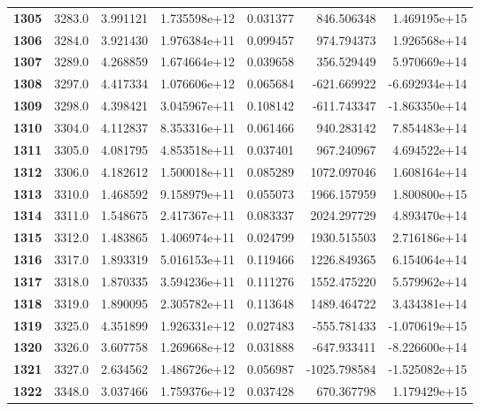\documentclass{report}[12pt]
\begin{document}
\begin{center}
\begin{tabular}{lrrrrrr}
\textbf{1305} &         3283.0 &   3.991121 &  1.735598e+12 &    0.031377 &   846.506348 &  1.469195e+15 \\
\textbf{1306} &         3284.0 &   3.921430 &  1.976384e+11 &    0.099457 &   974.794373 &  1.926568e+14 \\
\textbf{1307} &         3289.0 &   4.268859 &  1.674664e+12 &    0.039658 &   356.529449 &  5.970669e+14 \\
\textbf{1308} &         3297.0 &   4.417334 &  1.076606e+12 &    0.065684 &  -621.669922 & -6.692934e+14 \\
\textbf{1309} &         3298.0 &   4.398421 &  3.045967e+11 &    0.108142 &  -611.743347 & -1.863350e+14 \\
\textbf{1310} &         3304.0 &   4.112837 &  8.353316e+11 &    0.061466 &   940.283142 &  7.854483e+14 \\
\textbf{1311} &         3305.0 &   4.081795 &  4.853518e+11 &    0.037401 &   967.240967 &  4.694522e+14 \\
\textbf{1312} &         3306.0 &   4.182612 &  1.500018e+11 &    0.085289 &  1072.097046 &  1.608164e+14 \\
\textbf{1313} &         3310.0 &   1.468592 &  9.158979e+11 &    0.055073 &  1966.157959 &  1.800800e+15 \\
\textbf{1314} &         3311.0 &   1.548675 &  2.417367e+11 &    0.083337 &  2024.297729 &  4.893470e+14 \\
\textbf{1315} &         3312.0 &   1.483865 &  1.406974e+11 &    0.024799 &  1930.515503 &  2.716186e+14 \\
\textbf{1316} &         3317.0 &   1.893319 &  5.016153e+11 &    0.119466 &  1226.849365 &  6.154064e+14 \\
\textbf{1317} &         3318.0 &   1.870335 &  3.594236e+11 &    0.111276 &  1552.475220 &  5.579962e+14 \\
\textbf{1318} &         3319.0 &   1.890095 &  2.305782e+11 &    0.113648 &  1489.464722 &  3.434381e+14 \\
\textbf{1319} &         3325.0 &   4.351899 &  1.926331e+12 &    0.027483 &  -555.781433 & -1.070619e+15 \\
\textbf{1320} &         3326.0 &   3.607758 &  1.269668e+12 &    0.031888 &  -647.933411 & -8.226600e+14 \\
\textbf{1321} &         3327.0 &   2.634562 &  1.486726e+12 &    0.056987 & -1025.798584 & -1.525082e+15 \\
\textbf{1322} &         3348.0 &   3.037466 &  1.759376e+12 &    0.037428 &   670.367798 &  1.179429e+15 \\

\end{tabular}
\end{center}
\end{document}
